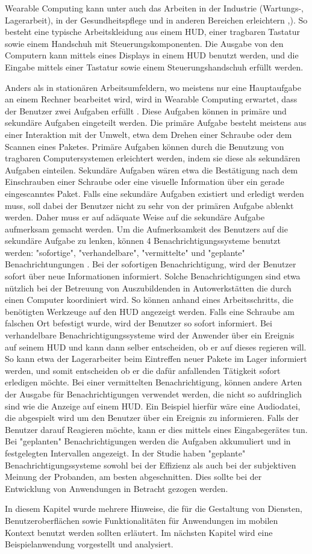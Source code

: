 Wearable Computing kann unter auch das Arbeiten in der Industrie (Wartungs-, Lagerarbeit), in der Gesundheitspflege und in anderen Bereichen erleichtern \cite{Witt:2006hi},\cite{Lawo:2008gg}). So besteht eine typische Arbeitskleidung aus einem HUD, einer tragbaren Tastatur sowie einem Handschuh mit Steuerungskomponenten. Die Ausgabe von den Computern kann mittels eines Displays in einem HUD benutzt werden, und die Eingabe mittels einer Tastatur sowie einem Steuerungshandschuh erfüllt werden. 

Anders als in stationären Arbeitsumfeldern, wo meistens nur eine Hauptaufgabe an einem Rechner bearbeitet wird, wird in Wearable Computing erwartet, dass der Benutzer zwei Aufgaben erfüllt \cite{Witt:2006hi}. Diese Aufgaben können in primäre und sekundäre Aufgaben eingeteilt werden. Die primäre Aufgabe besteht meistens aus einer Interaktion mit der Umwelt, etwa dem Drehen einer Schraube oder dem Scannen eines Paketes. Primäre Aufgaben können durch die Benutzung von tragbaren Computersystemen erleichtert werden, indem sie diese als sekundären Aufgaben einteilen. Sekundäre Aufgaben wären etwa die Bestätigung nach dem Einschrauben einer Schraube oder eine visuelle Information über ein gerade eingescanntes Paket. Falls eine sekundäre Aufgaben existiert und erledigt werden muss, soll dabei der Benutzer nicht zu sehr von der primären Aufgabe ablenkt werden. Daher muss er auf adäquate Weise auf die sekundäre Aufgabe aufmerksam gemacht werden. Um die Aufmerksamkeit des Benutzers auf die sekundäre Aufgabe zu lenken, können 4 Benachrichtigungssysteme benutzt werden: "sofortige", "verhandelbare", "vermittelte" und "geplante" Benachrichtungungen \cite{McFarlane:1999um}\cite{Nilsson:cq}. Bei der sofortigen Benachrichtigung, wird der Benutzer sofort über neue Informationen informiert. Solche Benachrichtigungen sind etwa nützlich bei der Betreuung von Auszubildenden in Autowerkstätten die durch einen Computer koordiniert wird. So können anhand eines Arbeitsschritts, die benötigten Werkzeuge auf den HUD angezeigt werden. Falls eine Schraube am falschen Ort befestigt wurde, wird  der Benutzer so sofort informiert. Bei verhandelbare Benachrichtigungssysteme wird der Anwender über ein Ereignis auf seinem HUD und kann dann selber entscheiden, ob er auf dieses regieren will. So kann etwa der Lagerarbeiter beim Eintreffen neuer Pakete im Lager informiert werden, und somit entscheiden ob er die dafür anfallenden Tätigkeit sofort erledigen möchte. Bei einer vermittelten Benachrichtigung, können andere Arten der Ausgabe für Benachrichtigungen verwendet werden, die nicht so aufdringlich sind wie die Anzeige auf einem HUD. Ein Beispiel hierfür wäre eine Audiodatei, die abgespielt wird um den Benutzer über ein Ereignis zu informieren. Falls der Benutzer darauf Reagieren möchte, kann er  dies mittels eines Eingabegerätes tun. Bei "geplanten" Benachrichtigungen werden die Aufgaben  akkumuliert und in festgelegten Intervallen angezeigt. In der Studie \cite{Nilsson:cq}  haben "geplante" Benachrichtigungssysteme sowohl bei der Effizienz als auch bei der subjektiven Meinung der Probanden,  am besten abgeschnitten. Dies sollte bei der Entwicklung von Anwendungen in Betracht gezogen werden.


In diesem Kapitel wurde mehrere Hinweise, die für die Gestaltung von Diensten, Benutzeroberflächen sowie Funktionalitäten für Anwendungen im mobilen Kontext benutzt werden sollten erläutert. Im nächsten Kapitel wird eine Beispielanwendung vorgestellt und analysiert.


